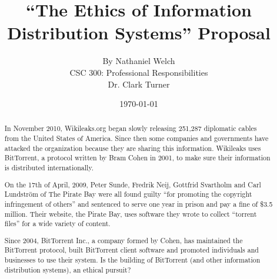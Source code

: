\documentclass[11pt]{article}
\begin{document}
\title{\vfill ``The Ethics of Information Distribution Systems'' Proposal} %
\author{
By Nathaniel Welch\vspace{10pt}\\
CSC 300: Professional Responsibilities\vspace{10pt}\\
Dr. Clark Turner\vspace{10pt}\\
}
\date{\today}

\maketitle

\vfill %
\begin{abstract}

In November 2010, Wikileaks.org began slowly releasing 251,287 diplomatic cables from the United States of America. \cite{cablegate} Since then some companies and governments have attacked the organization because they are sharing this information. Wikileaks uses BitTorrent, a protocol written by Bram Cohen in 2001, to make sure their information is distributed internationally.

On the 17th of April, 2009, Peter Sunde, Fredrik Neij, Gottfrid Svartholm and Carl Lundström of The Pirate Bay were all found guilty ``for promoting the copyright infringement of others'' and sentenced to serve one year in prison and pay a fine of \$3.5 million. \cite{tpbverdict} Their website, the Pirate Bay, uses software they wrote to collect ``torrent files'' for a wide variety of content.

Since 2004, BitTorrent Inc., a company formed by Cohen, has maintained the BitTorrent protocol, built BitTorrent client software and promoted individuals and businesses to use their system. Is the building of BitTorrent (and other information distribution systems), an ethical pursuit?
\end{abstract}
\thispagestyle{empty} %
\newpage

\thispagestyle{empty}  %
\tableofcontents
\end{document}
